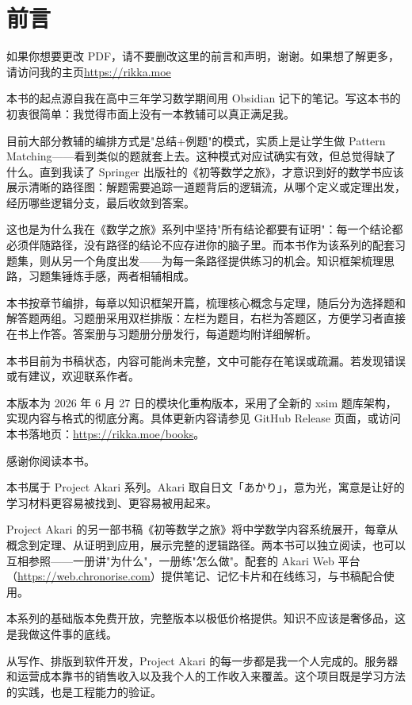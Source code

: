
\chapter*{前言}

如果你想要更改 PDF，请不要删改这里的前言和声明，谢谢。如果想了解更多，请访问我的主页\url{https://rikka.moe}

\medskip

本书的起点源自我在高中三年学习数学期间用 Obsidian 记下的笔记。写这本书的初衷很简单：我觉得市面上没有一本教辅可以真正满足我。

目前大部分教辅的编排方式是"总结+例题"的模式，实质上是让学生做 Pattern Matching——看到类似的题就套上去。这种模式对应试确实有效，但总觉得缺了什么。直到我读了 Springer 出版社的《初等数学之旅》，才意识到好的数学书应该展示清晰的路径图：解题需要追踪一道题背后的逻辑流，从哪个定义或定理出发，经历哪些逻辑分支，最后收敛到答案。

这也是为什么我在《数学之旅》系列中坚持"所有结论都要有证明"：每一个结论都必须伴随路径，没有路径的结论不应存进你的脑子里。而本书作为该系列的配套习题集，则从另一个角度出发——为每一条路径提供练习的机会。知识框架梳理思路，习题集锤炼手感，两者相辅相成。

本书按章节编排，每章以知识框架开篇，梳理核心概念与定理，随后分为选择题和解答题两组。习题册采用双栏排版：左栏为题目，右栏为答题区，方便学习者直接在书上作答。答案册与习题册分册发行，每道题均附详细解析。

本书目前为书稿状态，内容可能尚未完整，文中可能存在笔误或疏漏。若发现错误或有建议，欢迎联系作者。

\medskip

本版本为 2026 年 6 月 27 日的模块化重构版本，采用了全新的 xsim 题库架构，实现内容与格式的彻底分离。具体更新内容请参见 GitHub Release 页面，或访问本书落地页：\url{https://rikka.moe/books}。

\medskip

感谢你阅读本书。

\bigskip

本书属于 Project Akari 系列。Akari 取自日文「あかり」，意为光，寓意是让好的学习材料更容易被找到、更容易被用起来。

Project Akari 的另一部书稿《初等数学之旅》将中学数学内容系统展开，每章从概念到定理、从证明到应用，展示完整的逻辑路径。两本书可以独立阅读，也可以互相参照——一册讲"为什么"，一册练"怎么做"。配套的 Akari Web 平台（\url{https://web.chronorise.com}）提供笔记、记忆卡片和在线练习，与书稿配合使用。

本系列的基础版本免费开放，完整版本以极低价格提供。知识不应该是奢侈品，这是我做这件事的底线。

从写作、排版到软件开发，Project Akari 的每一步都是我一个人完成的。服务器和运营成本靠书的销售收入以及我个人的工作收入来覆盖。这个项目既是学习方法的实践，也是工程能力的验证。

\cleardoublepage
